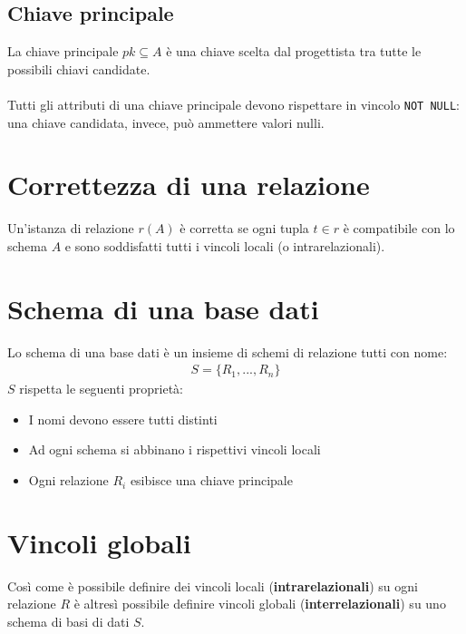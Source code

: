 \subsection{Chiave principale}
La chiave principale $pk \subseteq A$ è una chiave scelta dal progettista tra tutte le possibili chiavi candidate.\\\\
Tutti gli attributi di una chiave principale devono rispettare in vincolo \texttt{NOT NULL}: una chiave candidata, invece, può ammettere valori nulli.

\section{Correttezza di una relazione}
Un'istanza di relazione $r(A)$ è corretta se ogni tupla $t \in r$ è compatibile con lo schema $A$ e sono soddisfatti tutti i vincoli locali (o intrarelazionali).

\section{Schema di una base dati}
Lo schema di una base dati è un insieme di schemi di relazione tutti con nome:
    \begin{equation}\begin{aligned}
        S = \{  R_1, ..., R_n   \}
    \end{aligned}\end{equation}
$S$ rispetta le seguenti proprietà:
    \begin{itemize}
        \item{I nomi devono essere tutti distinti}
        \item{Ad ogni schema si abbinano i rispettivi vincoli locali}
        \item{Ogni relazione $R_i$ esibisce una chiave principale}
    \end{itemize}

\section{Vincoli globali}
Così come è possibile definire dei vincoli locali (\textbf{intrarelazionali}) su ogni relazione $R$ è altresì possibile definire vincoli globali (\textbf{interrelazionali}) su uno schema di basi di dati $S$.

